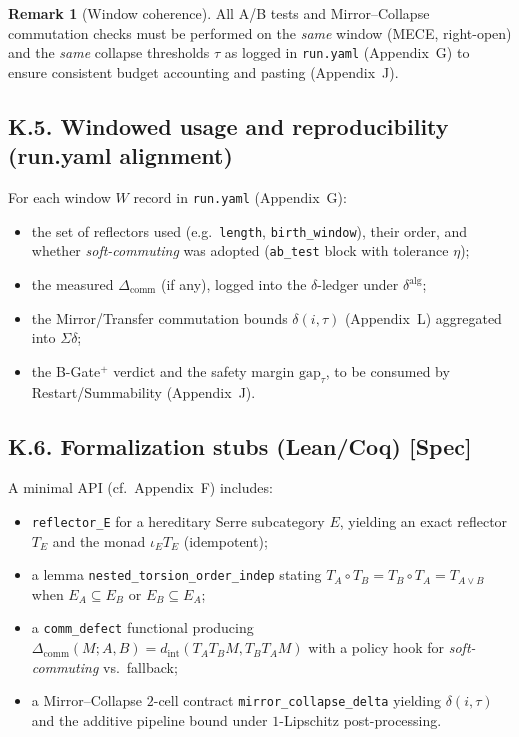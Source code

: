 \documentclass[11pt]{article}
\DeclareRobustCommand{\hyp}{\nobreakdash-}
\numberwithin{equation}{section}
\theoremstyle{definition}
\newtheorem{remark}[theorem]{Remark}
\begin{document}
\begin{remark}[Window coherence]
All A/B tests and Mirror–Collapse commutation checks must be performed on the \emph{same} window (MECE, right\hyp open) and the \emph{same} collapse thresholds \(\tau\) as logged in \texttt{run.yaml} (Appendix~G) to ensure consistent budget accounting and pasting (Appendix~J).
\end{remark}

\subsection*{K.5. Windowed usage and reproducibility (run.yaml alignment)}
For each window \(W\) record in \texttt{run.yaml} (Appendix~G):
\begin{itemize}\itemsep0.2em
  \item the set of reflectors used (e.g.\ \texttt{length}, \texttt{birth\_window}), their order, and whether \emph{soft\hyp commuting} was adopted (\texttt{ab\_test} block with tolerance \(\eta\));
  \item the measured \(\Delta_{\mathrm{comm}}\) (if any), logged into the \(\delta\)\hyp ledger under \(\delta^{\mathrm{alg}}\);
  \item the Mirror/Transfer commutation bounds \(\delta(i,\tau)\) (Appendix~L) aggregated into \(\Sigma\delta\);
  \item the B\hyp Gate\(^{+}\) verdict and the safety margin \(\mathrm{gap}_\tau\), to be consumed by Restart/Summability (Appendix~J).
\end{itemize}

\subsection*{K.6. Formalization stubs (Lean/Coq) [Spec]}
A minimal API (cf.\ Appendix~F) includes:
\begin{itemize}\itemsep0.2em
  \item \texttt{reflector\_E} for a hereditary Serre subcategory \(E\), yielding an exact reflector \(T_E\) and the monad \(\iota_E T_E\) (idempotent);
  \item a lemma \texttt{nested\_torsion\_order\_indep} stating \(T_A\circ T_B=T_B\circ T_A=T_{A\vee B}\) when \(E_A\subseteq E_B\) or \(E_B\subseteq E_A\);
  \item a \texttt{comm\_defect} functional producing \(\Delta_{\mathrm{comm}}(M;A,B)=d_{\mathrm{int}}(T_AT_BM,T_BT_AM)\) with a policy hook for \emph{soft\hyp commuting} vs.\ fallback;
  \item a Mirror–Collapse \(2\)\hyp cell contract \texttt{mirror\_collapse\_delta} yielding \(\delta(i,\tau)\) and the additive pipeline bound under \(1\)\hyp Lipschitz post\hyp processing.
\end{itemize}
\end{document}
